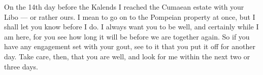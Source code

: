 

 On the 14th day before the Kalends I reached the Cumaean estate with your Libo --- or rather ours. I mean to go on to the Pompeian property at once, but I shall let you know before I do. I always want you to be well, and certainly while I am here, for you see how long it will be before we are together again. So if you have any engagement set with your gout, see to it that you put it off for another day. Take care, then, that you are well, and look for me within the next two or three days.

